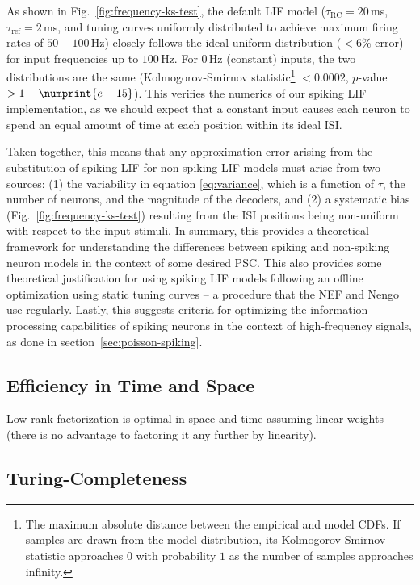 As shown in Fig.~\ref{fig:frequency-ks-test}, the default LIF model ($\tau_\text{RC} = 20$\,ms, $\tau_\text{ref} = 2$\,ms, and tuning curves uniformly distributed to achieve maximum firing rates of $50-100$\,Hz) closely follows the ideal uniform distribution ($< 6$\% error) for input frequencies up to $100$\,Hz. For $0$\,Hz (constant) inputs, the two distributions are the same (Kolmogorov-Smirnov statistic\footnote{
The maximum absolute distance between the empirical and model CDFs.
If samples are drawn from the model distribution, its Kolmogorov-Smirnov statistic approaches $0$ with probability $1$ as the number of samples approaches infinity.}%
$<0.0002$, $p$-value~$> 1-\numprint{e-15}$).
This verifies the numerics of our spiking LIF implementation, as we should expect that a constant input causes each neuron to spend an equal amount of time at each position within its ideal ISI.

Taken together, this means that any approximation error arising from the substitution of spiking LIF for non-spiking LIF models must arise from two sources: (1) the variability in equation \ref{eq:variance}, which is a function of $\tau$, the number of neurons, and the magnitude of the decoders, and (2) a systematic bias (Fig.~\ref{fig:frequency-ks-test}) resulting from the ISI positions being non-uniform with respect to the input stimuli.
In summary, this provides a theoretical framework for understanding the differences between spiking and non-spiking neuron models in the context of some desired PSC.
This also provides some theoretical justification for using spiking LIF models following an offline optimization using static tuning curves -- a procedure that the NEF and Nengo use regularly.
Lastly, this suggests criteria for optimizing the information-processing capabilities of spiking neurons in the context of high-frequency signals, as done in section~\ref{sec:poisson-spiking}.


\subsection{Efficiency in Time and Space}

Low-rank factorization is optimal in space and time assuming linear weights (there is no advantage to factoring it any further by linearity).

\subsection{Turing-Completeness}
\label{sec:nef-turing}

